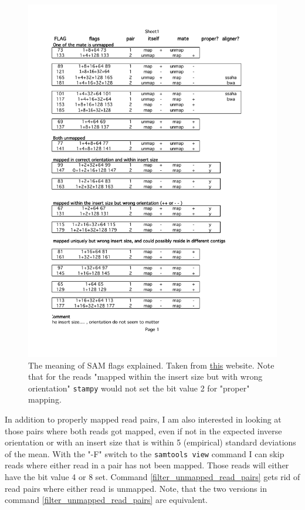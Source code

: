 \documentclass{article}\usepackage[]{graphicx}\usepackage[]{color}
\begin{document}
\begin{figure}[htp]
\centering
\includegraphics[height=.9\textheight]{./figure/sam_flags_meaning}
\caption{The meaning of SAM flags explained. Taken from \href{http://ppotato.wordpress.com/2010/08/25/samtool-bitwise-flag-paired-reads/}{this} website. Note that for the reads "mapped within the insert size but with wrong orientation" \texttt{stampy} would not set the bit value 2 for "proper" mapping.}
\label{sam_flags_meaning}
\end{figure}

In addition to properly mapped read pairs, I am also interested in looking at those pairs where both reads got mapped, even if not in the expected inverse orientation or with an insert size that is within 5 (empirical) standard deviations of the mean. With the "-F" switch to the \texttt{samtools view} command I can skip reads where either read in a pair has not been mapped. Those reads will either have the bit value 4 or 8 set. Command \ref{filter_unmapped_read_pairs} gets rid of read pairs where either read is unmapped. Note, that the two versions in command \ref{filter_unmapped_read_pairs} are equivalent.
\end{document}
